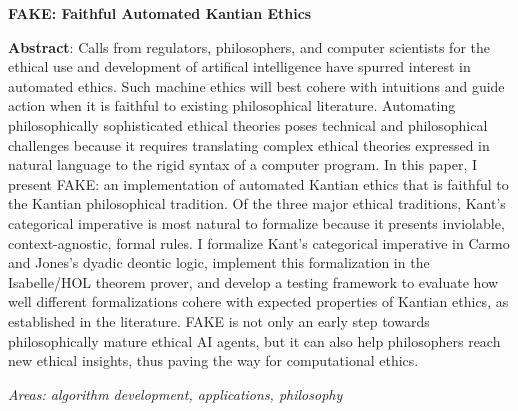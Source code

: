 \documentclass[11pt]{article}
\begin{document}
\noindent \textbf{FAKE: Faithful Automated Kantian Ethics}

\medskip 

\noindent \textbf{Abstract}: Calls from regulators, philosophers, and computer scientists for the ethical
use and development of artifical intelligence have spurred interest in automated ethics. Such machine 
ethics will best cohere with intuitions and guide action when it is faithful to existing philosophical
literature. Automating philosophically sophisticated ethical theories poses technical and philosophical
challenges because it requires translating
complex ethical theories expressed in natural language to the rigid syntax of a computer program. In 
this paper, I present FAKE: an implementation of automated Kantian 
ethics that is faithful to the Kantian philosophical tradition. Of the three major ethical 
traditions, Kant's categorical imperative is most natural to formalize because it presents inviolable, 
context-agnostic, formal rules.  I formalize Kant's categorical imperative 
in Carmo and Jones's dyadic deontic logic, implement this formalization 
in the Isabelle/HOL theorem prover, and develop a testing framework to evaluate how well 
different formalizations cohere with expected properties of Kantian ethics, as established in the literature. 
FAKE is not only an early step towards philosophically mature ethical AI agents, but it can also help
philosophers reach new ethical insights, thus paving the way for computational ethics.

\smallskip
\noindent \emph{Areas: algorithm development, applications, philosophy}
\end{document}
